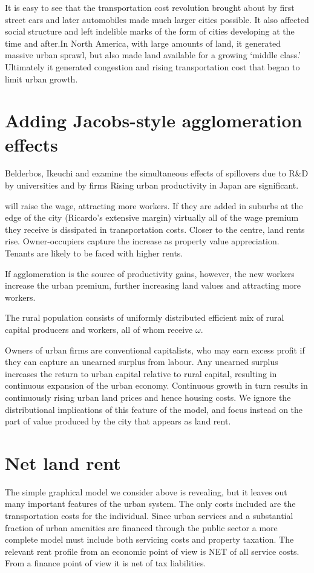  It is easy to see that the transportation cost revolution brought about by first street cars and later automobiles made much larger cities possible.  It also affected social structure and left indelible marks of the form of cities developing at the time and after.In North America, with large amounts of land, it generated massive urban sprawl, but also made land available for a growing `middle class.' Ultimately it generated congestion and rising transportation cost that began to limit urban growth. 

\section{Adding Jacobs-style agglomeration effects}
Belderbos, Ikeuchi and \cite{} examine the simultaneous effects of spillovers due to R&D by universities and by firms 
Rising urban productivity in Japan are significant. 

will raise the wage, attracting more workers. If they are added in suburbs at the edge of the city (Ricardo's extensive margin) virtually all of the wage premium they receive is dissipated in transportation costs. Closer to the centre,  land rents rise. Owner-occupiers capture the increase as property value appreciation. Tenants are likely to be faced with higher rents.      

If agglomeration is the source of productivity gains, however, the new workers increase the urban premium, further increasing land values and attracting more workers. 



The rural population consists of uniformly distributed efficient mix of rural capital producers and workers, all of whom receive $\omega$.%



 Owners of urban firms are  conventional  capitalists, who may earn excess profit if they can capture an unearned surplus from labour.  Any unearned surplus increases the return to urban capital relative to rural capital, resulting in continuous expansion of the urban economy. Continuous growth in turn results in continuously rising urban land prices and hence housing costs. We ignore the distributional implications of this feature of the model, and focus instead on the part of value produced by the city that appears as land rent. 
  
\section{Net land rent} 
The simple graphical model we consider above is revealing, but it leaves out many important features of the urban system. The only costs included are the transportation costs for the individual.  Since urban services and  a substantial fraction of urban amenities are financed through the public sector a more complete model must include both servicing costs and property taxation. The relevant rent profile from an economic point of view is NET of all service costs. From a finance point of view it is net of tax liabilities.

